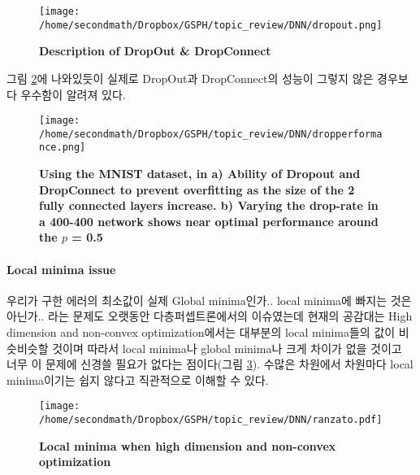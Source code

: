 \documentclass[10pt]{article}
\begin{document}
\begin{figure}[!ht]
\centering
\texttt{[image: /home/secondmath/Dropbox/GSPH/topic\_review/DNN/dropout.png]}
\caption{\bf{Description of DropOut \& DropConnect\cite{dropfig}}}
\label{dropfig1}
\end{figure}

그림 \ref{dropperformance}에 나와있듯이 실제로 DropOut과 DropConnect의 성능이 그렇지 않은 경우보다 우수함이 알려져 있다\cite{wan2013regularization}.

\begin{figure}[!ht]
\centering
\texttt{[image: /home/secondmath/Dropbox/GSPH/topic\_review/DNN/dropperformance.png]}
\caption{\bf{Using the MNIST dataset, in a) Ability of Dropout and DropConnect to prevent overfitting as the size of the 2 fully connected layers increase. b) Varying the drop-rate in a 400-400 network shows near optimal performance around the $p$ = 0.5\cite{wan2013regularization}}}
\label{dropperformance}
\end{figure}

\paragraph{Local minima issue}
우리가 구한 에러의 최소값이 실제 Global minima인가.. local minima에 빠지는 것은 아닌가.. 라는 문제도 오랫동안 다층퍼셉트론에서의 이슈였는데 현재의 공감대는 High dimension and non-convex optimization에서는 대부분의 local minima들의 값이 비슷비슷할 것이며 따라서 local minima나 global minima나 크게 차이가 없을 것이고 너무 이 문제에 신경쓸 필요가 없다는 점이다(그림 \ref{localminima})\cite{minima}. 수많은 차원에서 차원마다 local minima이기는 쉽지 않다고 직관적으로 이해할 수 있다.  

\begin{figure}[!ht]
\centering
\texttt{[image: /home/secondmath/Dropbox/GSPH/topic\_review/DNN/ranzato.pdf]}
\caption{\bf{Local minima when high dimension and non-convex optimization \cite{minima}}}
\label{localminima}
\end{figure}
\end{document}
